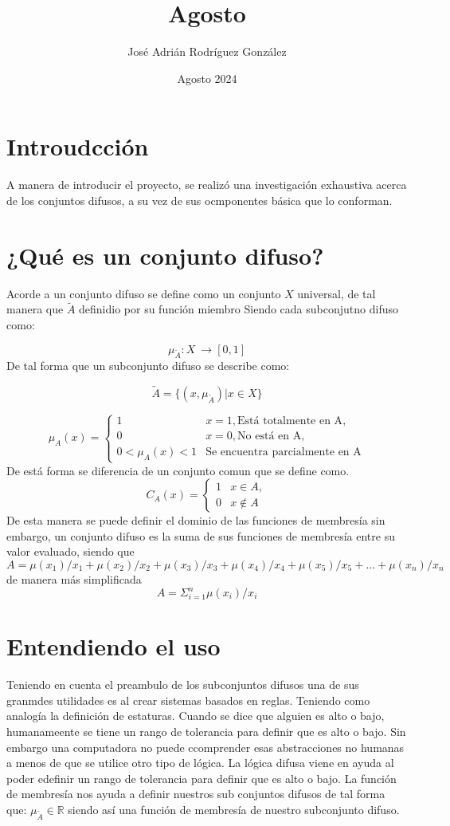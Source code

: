 \documentclass{article}
\title{Agosto}
\author{José Adrián Rodríguez González}
\date{Agosto 2024}
\begin{document}
\maketitle
\section{Introudcción}
A manera de introducir el proyecto, se realizó una investigación exhaustiva acerca de los conjuntos difusos, a su vez de sus ocmponentes básica que lo conforman.
\section{¿Qué es un conjunto difuso?}
Acorde a \citep{ZADEH1965338} un conjunto difuso se define como un conjunto $X$ universal, de tal manera que $\tilde{A}$ definidio por su función miembro 
Siendo cada subconjutno difuso como:

\[\mu_{\tilde{A}}: X\ \rightarrow[0,1]\]
De tal forma que un subconjunto difuso se describe como: 

\[
\tilde{A}=\{(x,\mu_{\tilde{A}})| x\in X\}
\]

\[
\mu_A(x) =
\begin{cases}
  1 & x=1,\text{Está totalmente en A},  \\
  0 & x=0, \text{No está en A}, \\
  0<\mu_A(x)<1 & \text{Se encuentra parcialmente en A}
\end{cases}
\]
De está forma se diferencia de un conjunto comun que se define como.
\[
C_A(x) =
\begin{cases}
  1 & x \in A,  \\
  0 & x \notin  A
\end{cases}
\]
De esta manera se puede definir el dominio de las funciones de membresía sin embargo, un conjunto difuso es la suma de sus funciones de membresía entre su valor evaluado, siendo que
$$A = \mu(x_1) /x_1+\mu(x_2) /x_2+\mu(x_3) /x_3+\mu(x_4) /x_4+\mu(x_5) /x_5+\dots +\mu(x_n) /x_n$$
de manera más simplificada
$$A= \Sigma^n_{i=1} \mu(x_i) /x_i$$
\section{Entendiendo el uso}
Teniendo en cuenta el preambulo de los subconjuntos difusos una de sus granmdes utilidades es al crear sistemas basados en reglas.  Teniendo como analogía la definición de estaturas. Cuando se dice que alguien es alto o bajo, humanameente se tiene un rango de tolerancia para definir que es alto o bajo. Sin embargo una computadora no puede ccomprender esas abstracciones no humanas a menos de que se utilice otro tipo de lógica. La lógica difusa viene en ayuda al poder edefinir un rango de tolerancia para definir que es alto o bajo.
La función de membresía nos ayuda a definir nuestros sub conjuntos difusos de tal forma que: 
\(\mu_{\tilde{A}} \in \mathbb{R}\) siendo así una función de membresía de nuestro subconjunto difuso.
\end{document}
